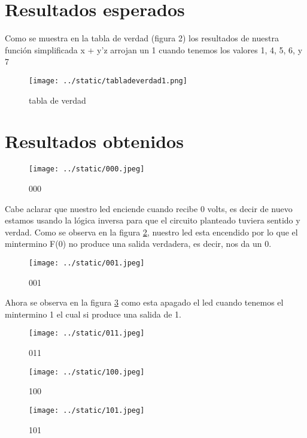 \documentclass{article}
\begin{document}
\begin{multicols}{2}
\section*{Resultados esperados}\label{Resultados esperados}
Como se muestra en la tabla de verdad (figura 2) los resultados de nuestra función simplificada x + y'z arrojan un 1 cuando tenemos los valores 1, 4, 5, 6, y 7
\begin{figure}[H]
	\centering
	\texttt{[image: ../static/tabladeverdad1.png]}
	\caption{tabla de verdad}
	\label{table:1}
\end{figure}

\section*{Resultados obtenidos}\label{Resultados obtenidos}

\begin{figure}[H]
	\centering
	\texttt{[image: ../static/000.jpeg]}
	\caption{000}
	\label{fig:2}
\end{figure}
Cabe aclarar que nuestro led enciende cuando recibe 0 volts, es decir de nuevo estamos usando la lógica inversa para que el circuito planteado tuviera sentido y verdad.
Como se observa en la figura \ref*{fig:2}, nuestro led esta encendido por lo que el mintermino F(0) no produce una salida verdadera, es decir, nos da un 0. 

\begin{figure}[H]
	\centering
	\texttt{[image: ../static/001.jpeg]}
	\caption{001}
	\label{fig:3}
\end{figure}
	
Ahora se observa en la figura \ref*{fig:3} como esta apagado el led cuando tenemos el mintermino 1 el cual si produce una salida de 1.

\begin{figure}[H]
	\centering
	\texttt{[image: ../static/011.jpeg]}
	\caption{011}
	\label{fig:4}
\end{figure}

\begin{figure}[H]
	\centering
	\texttt{[image: ../static/100.jpeg]}
	\caption{100}
	\label{fig:5}
\end{figure}

\begin{figure}[H]
	\centering
	\texttt{[image: ../static/101.jpeg]}
	\caption{101}
	\label{fig:6}
\end{figure}


\end{multicols}
\end{document}
